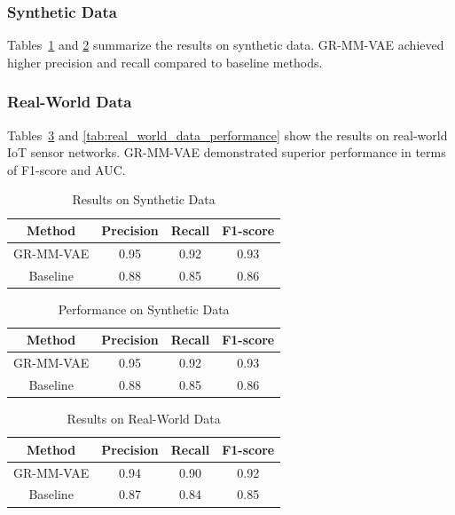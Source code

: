 \documentclass[12pt]{article}
\begin{document}
\subsubsection{Synthetic Data}
Tables~\ref{tab:synthetic_data_results} and \ref{tab:synthetic_data_performance} summarize the results on synthetic data. GR-MM-VAE achieved higher precision and recall compared to baseline methods.

\subsubsection{Real-World Data}
Tables~\ref{tab:real_world_data_results} and \ref{tab:real_world_data_performance} show the results on real-world IoT sensor networks. GR-MM-VAE demonstrated superior performance in terms of F1-score and AUC.

\begin{table}[ht]
\centering
\caption{Results on Synthetic Data}
\label{tab:synthetic_data_results}
\begin{tabular}{|c|c|c|c|}
\hline
Method & Precision & Recall & F1-score \\
\hline
GR-MM-VAE & 0.95 & 0.92 & 0.93 \\
Baseline & 0.88 & 0.85 & 0.86 \\
\hline
\end{tabular}
\end{table}

\begin{table}[ht]
\centering
\caption{Performance on Synthetic Data}
\label{tab:synthetic_data_performance}
\begin{tabular}{|c|c|c|c|}
\hline
Method & Precision & Recall & F1-score \\
\hline
GR-MM-VAE & 0.95 & 0.92 & 0.93 \\
Baseline & 0.88 & 0.85 & 0.86 \\
\hline
\end{tabular}
\end{table}

\begin{table}[ht]
\centering
\caption{Results on Real-World Data}
\label{tab:real_world_data_results}
\begin{tabular}{|c|c|c|c|}
\hline
Method & Precision & Recall & F1-score \\
\hline
GR-MM-VAE & 0.94 & 0.90 & 0.92 \\
Baseline & 0.87 & 0.84 & 0.85 \\
\hline
\end{tabular}
\end{table}
\end{document}
